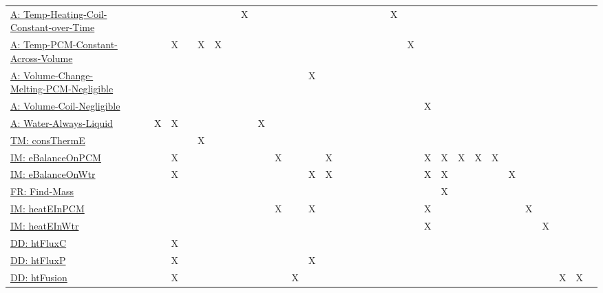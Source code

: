 \documentclass[12pt]{article}
\begin{document}
\begin{longtable}{l l l l l l l l l l l l l l l l l l l l l l l l l l l l l l l l l}
\hyperref[assumpTHCCoT]{A: Temp-Heating-Coil-Constant-over-Time} &  &  &  &  &  &  &  &  & X &  &  &  &  &  &  &  &  &  &  & X &  &  &  &  &  &  &  &  &  &  &  & 
\\
\hyperref[assumpTPCAV]{A: Temp-PCM-Constant-Across-Volume} &  &  &  & X &  & X & X &  &  &  &  &  &  &  &  &  &  &  &  &  & X &  &  &  &  &  &  &  &  &  &  & 
\\
\hyperref[assumpVCMPN]{A: Volume-Change-Melting-PCM-Negligible} &  &  &  &  &  &  &  &  &  &  &  &  & X &  &  &  &  &  &  &  &  &  &  &  &  &  &  &  &  &  &  & 
\\
\hyperref[assumpVCN]{A: Volume-Coil-Negligible} &  &  &  &  &  &  &  &  &  &  &  &  &  &  &  &  &  &  &  &  &  & X &  &  &  &  &  &  &  &  &  & 
\\
\hyperref[assumpWAL]{A: Water-Always-Liquid} &  &  & X & X &  &  &  &  &  & X &  &  &  &  &  &  &  &  &  &  &  &  &  &  &  &  &  &  &  &  &  & 
\\
\hyperref[TM:consThermE]{TM: consThermE} &  &  &  &  &  & X &  &  &  &  &  &  &  &  &  &  &  &  &  &  &  &  &  &  &  &  &  &  &  &  &  & 
\\
\hyperref[IM:eBalanceOnPCM]{IM: eBalanceOnPCM} &  &  &  & X &  &  &  &  &  &  & X &  &  & X &  &  &  &  &  &  &  & X & X & X & X & X &  &  &  &  &  & 
\\
\hyperref[IM:eBalanceOnWtr]{IM: eBalanceOnWtr} &  &  &  & X &  &  &  &  &  &  &  &  & X & X &  &  &  &  &  &  &  & X & X &  &  &  & X &  &  &  &  & 
\\
\hyperref[findMass]{FR: Find-Mass} &  &  &  &  &  &  &  &  &  &  &  &  &  &  &  &  &  &  &  &  &  &  & X &  &  &  &  &  &  &  &  & 
\\
\hyperref[IM:heatEInPCM]{IM: heatEInPCM} &  &  &  &  &  &  &  &  &  &  & X &  & X &  &  &  &  &  &  &  &  & X &  &  &  &  &  & X &  &  &  & 
\\
\hyperref[IM:heatEInWtr]{IM: heatEInWtr} &  &  &  &  &  &  &  &  &  &  &  &  &  &  &  &  &  &  &  &  &  & X &  &  &  &  &  &  & X &  &  & 
\\
\hyperref[DD:htFluxC]{DD: htFluxC} &  &  &  & X &  &  &  &  &  &  &  &  &  &  &  &  &  &  &  &  &  &  &  &  &  &  &  &  &  &  &  & 
\\
\hyperref[DD:htFluxP]{DD: htFluxP} &  &  &  & X &  &  &  &  &  &  &  &  & X &  &  &  &  &  &  &  &  &  &  &  &  &  &  &  &  &  &  & 
\\
\hyperref[DD:htFusion]{DD: htFusion} &  &  &  & X &  &  &  &  &  &  &  & X &  &  &  &  &  &  &  &  &  &  &  &  &  &  &  &  &  & X & X & 
\\

\end{longtable}
\end{document}
